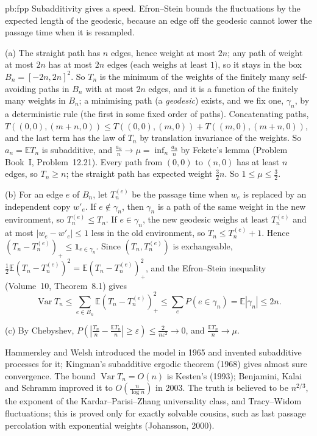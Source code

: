 \begin{solution}{pb:fpp}
\idea Subadditivity gives a speed. Efron--Stein bounds the fluctuations by the expected length of the geodesic, because an edge off the geodesic cannot lower the passage
time when it is resampled.

\writeup (a) The straight path has $n$ edges, hence weight at most $2n$; any path of weight at most $2n$ has at most $2n$ edges (each weighs at least $1$), so it stays in the box
$B_n=[-2n,2n]^2$. So $T_n$ is the minimum of the weights of the finitely many self-avoiding paths in $B_n$ with at most $2n$ edges, and it is a function of the finitely many
weights in $B_n$; a minimising path (a \emph{geodesic}) exists, and we fix one, $\gamma_n$, by a deterministic rule (the first in some fixed order of paths). Concatenating paths,
$T((0,0),(m+n,0))\le T((0,0),(m,0))+T((m,0),(m+n,0))$, and the last term has the law of $T_n$ by translation invariance of the weights. So $a_n=\mathbb ET_n$ is subadditive,
and $\frac{a_n}n\to\mu=\inf_n\frac{a_n}n$ by Fekete's lemma (Problem Book~I, Problem~12.21). Every path from $(0,0)$ to $(n,0)$ has at least $n$ edges, so $T_n\ge n$; the
straight path has expected weight $\frac32n$. So $1\le\mu\le\frac32$.

(b) For an edge $e$ of $B_n$, let $T_n^{(e)}$ be the passage time when $w_e$ is replaced by an independent copy $w'_e$. If $e\notin\gamma_n$, then $\gamma_n$ is a path of
the same weight in the new environment, so $T_n^{(e)}\le T_n$. If $e\in\gamma_n$, the new geodesic weighs at least $T_n^{(e)}$ and at most $|w_e-w'_e|\le1$ less in the old
environment, so $T_n\le T_n^{(e)}+1$. Hence $(T_n-T_n^{(e)})_+\le\mathbf 1_{e\in\gamma_n}$. Since $(T_n,T_n^{(e)})$ is exchangeable, $\frac12\mathbb E(T_n-T_n^{(e)})^2=\mathbb E(T_n-T_n^{(e)})_+^2$,
and the Efron--Stein inequality (Volume~10, Theorem~8.1) gives
\[
\operatorname{Var}T_n\le\sum_{e\in B_n}\mathbb E(T_n-T_n^{(e)})_+^2\le\sum_eP(e\in\gamma_n)=\mathbb E|\gamma_n|\le2n.
\]

(c) By Chebyshev, $P(|\frac{T_n}n-\frac{\mathbb ET_n}n|\ge\varepsilon)\le\frac{2}{n\varepsilon^2}\to0$, and $\frac{\mathbb ET_n}n\to\mu$.

\leads Hammersley and Welsh introduced the model in 1965 and invented subadditive processes for it; Kingman's subadditive ergodic theorem (1968) gives almost sure convergence. The
bound $\operatorname{Var}T_n=O(n)$ is Kesten's (1993); Benjamini, Kalai and Schramm improved it to $O(\frac n{\log n})$ in 2003. The truth is believed to be $n^{2/3}$, the exponent
of the Kardar--Parisi--Zhang universality class, and Tracy--Widom fluctuations; this is proved only for exactly solvable cousins, such as last passage percolation with
exponential weights (Johansson, 2000).
\end{solution}

